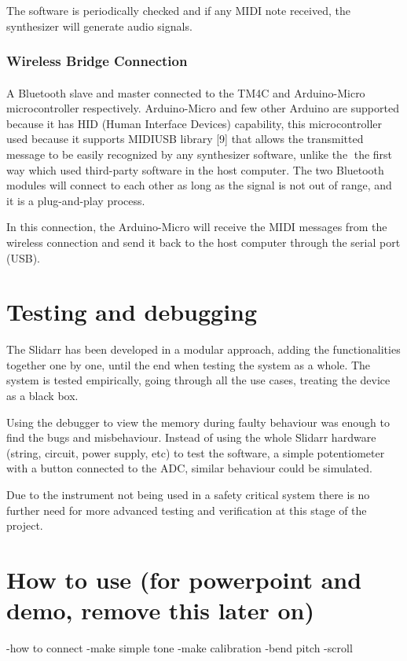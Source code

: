 \documentclass{article}
\begin{document}
The software is periodically checked and if any MIDI note received, the synthesizer will generate audio signals.

\subsubsection{Wireless Bridge Connection}
\paragraph{}A Bluetooth slave and master connected to the TM4C and Arduino-Micro microcontroller respectively. Arduino-Micro and few other Arduino are supported because it has HID (Human Interface Devices) capability, this microcontroller used because it supports MIDIUSB library [9] that allows the transmitted message to be easily recognized by any synthesizer software, unlike the the first way which used third-party software in the host computer. The two Bluetooth modules will connect to each other as long as the signal is not out of range, and it is a plug-and-play process.

In this connection, the Arduino-Micro will receive the MIDI messages from the wireless connection and send it back to the host computer through the serial port (USB). 

\section{Testing and debugging}
The Slidarr has been developed in a modular approach, adding the functionalities together one by one, until the end when testing the system as a whole. The system is tested empirically, going through all the use cases, treating the device as a black box.

Using the debugger to view the memory during faulty behaviour was enough to find the bugs and misbehaviour. Instead of using the whole Slidarr hardware (string, circuit, power supply, etc) to test the software, a simple potentiometer with a button connected to the ADC, similar behaviour could be simulated.

Due to the instrument not being used in a safety critical system there is no further need for more advanced testing and verification at this stage of the project.

\section{How to use (for powerpoint and demo, remove this later on)}
-how to connect
-make simple tone
-make calibration
-bend pitch
-scroll
\end{document}
